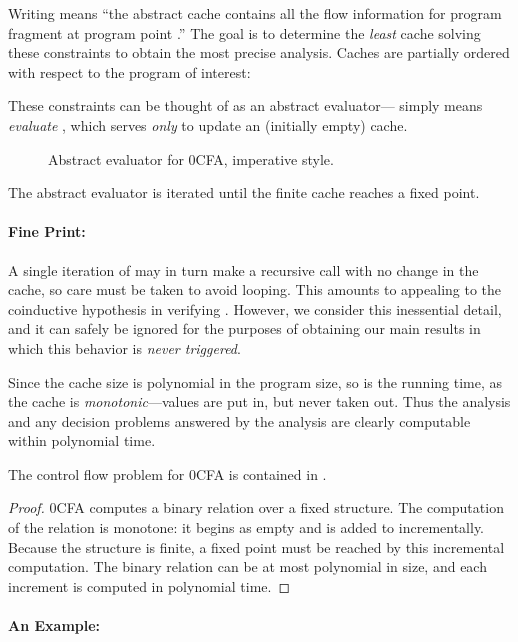 Writing  means ``the abstract cache
contains all the flow information for program fragment  at program
point .''  The goal is to determine the {\em least} cache
solving these constraints to obtain the most precise analysis.  Caches
are partially ordered with respect to the program of interest:


These constraints can be thought of as an abstract evaluator---
 simply means {\em evaluate} , which
serves {\em only} to update an (initially empty) cache.

\begin{figure}[h]

\caption{Abstract evaluator  for 0CFA, imperative style.}
\label{fig-0cfa-imperative}
\end{figure}

The abstract evaluator  is iterated until the finite cache
reaches a fixed point.

\paragraph{Fine Print:} A single iteration of  may in turn
make a recursive call  with no change in the cache, so care
must be taken to avoid looping.  This amounts to appealing to the
coinductive hypothesis  in verifying
.  However, we consider this inessential
detail, and it can safely be ignored for the purposes of obtaining our
main results in which this behavior is {\em never triggered}.

Since the cache size is polynomial in the program size, so is the
running time, as the cache is {\em monotonic}---values are put in, but
never taken out.  Thus the analysis and any decision problems
answered by the analysis are clearly computable within polynomial
time.

\begin{lemma}
The control flow problem for 0CFA is contained in \ptime.
\end{lemma}
\begin{proof}
0CFA computes a binary relation over a fixed structure.  The
computation of the relation is monotone: it begins as empty and is
added to incrementally.  Because the structure is finite, a fixed
point must be reached by this incremental computation.  The binary
relation can be at most polynomial in size, and each increment is
computed in polynomial time.
\end{proof}


\paragraph{An Example:} 

